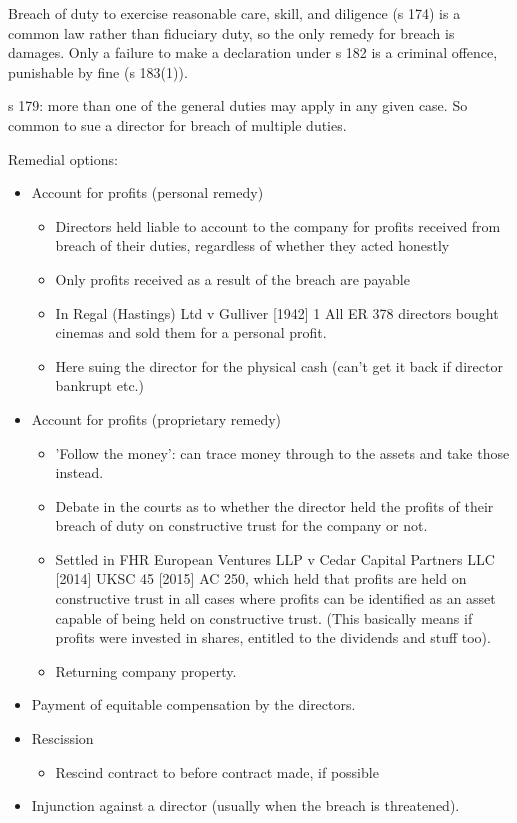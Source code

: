 \documentclass[
]{article}
\providecommand{\tightlist}{%
  \setlength{\itemsep}{0pt}\setlength{\parskip}{0pt}}
\begin{document}
Breach of duty to exercise reasonable care, skill, and diligence (s 174)
is a common law rather than fiduciary duty, so the only remedy for
breach is damages. Only a failure to make a declaration under s 182 is a
criminal offence, punishable by fine (s 183(1)).

s 179: more than one of the general duties may apply in any given case.
So common to sue a director for breach of multiple duties.

Remedial options:

\begin{itemize}
\tightlist
\item
  Account for profits (personal remedy)

  \begin{itemize}
  \tightlist
  \item
    Directors held liable to account to the company for profits received
    from breach of their duties, regardless of whether they acted
    honestly
  \item
    Only profits received as a result of the breach are payable
  \item
    In Regal (Hastings) Ltd v Gulliver {[}1942{]} 1 All ER 378 directors
    bought cinemas and sold them for a personal profit.
  \item
    Here suing the director for the physical cash (can't get it back if
    director bankrupt etc.)
  \end{itemize}
\item
  Account for profits (proprietary remedy)

  \begin{itemize}
  \tightlist
  \item
    'Follow the money': can trace money through to the assets and take
    those instead.
  \item
    Debate in the courts as to whether the director held the profits of
    their breach of duty on constructive trust for the company or not.
  \item
    Settled in FHR European Ventures LLP v Cedar Capital Partners LLC
    {[}2014{]} UKSC 45 {[}2015{]} AC 250, which held that profits are
    held on constructive trust in all cases where profits can be
    identified as an asset capable of being held on constructive trust.
    (This basically means if profits were invested in shares, entitled
    to the dividends and stuff too).
  \item
    Returning company property.
  \end{itemize}
\item
  Payment of equitable compensation by the directors.
\item
  Rescission

  \begin{itemize}
  \tightlist
  \item
    Rescind contract to before contract made, if possible
  \end{itemize}
\item
  Injunction against a director (usually when the breach is threatened).
\end{itemize}
\end{document}
